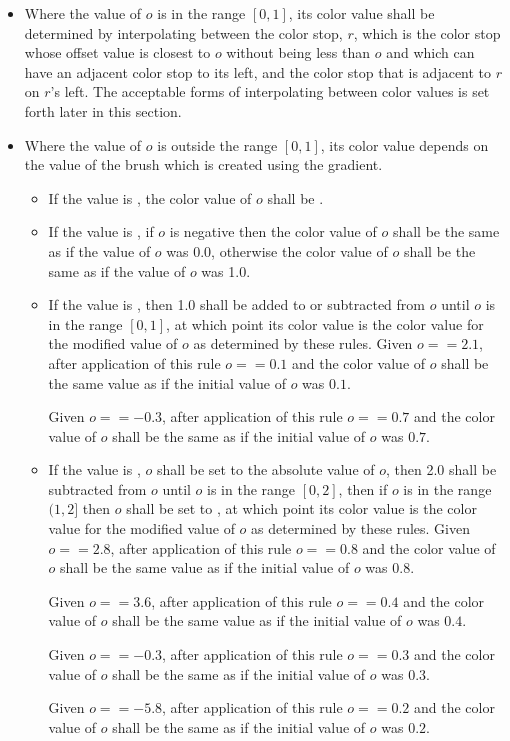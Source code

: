 \begin{itemize}
\item Where the value of $o$ is in the range $[0,1]$, its color value shall be determined by interpolating between the color stop, $r$, which is the color stop whose offset value is closest to $o$ without being less than $o$ and which can have an adjacent color stop to its left, and the color stop that is adjacent to $r$ on $r$'s left. The acceptable forms of interpolating between color values is set forth later in this section.

\item Where the value of $o$ is outside the range $[0,1]$, its color value depends on the  value of the brush which is created using the gradient.
	\begin{itemize}
	\item If the  value is , the color value of $o$ shall be .
	
	\item If the  value is , if $o$ is negative then the color value of $o$ shall be the same as if the value of $o$ was 0.0, otherwise the color value of $o$ shall be the same as if the value of $o$ was 1.0.
	
	\item If the  value is , then 1.0 shall be added to or subtracted from $o$ until $o$ is in the range $[0,1]$, at which point its color value is the color value for the modified value of $o$ as determined by these rules.
	\enterexample
	Given $o == 2.1$, after application of this rule $o == 0.1$ and the color value of $o$ shall be the same value as if the initial value of $o$ was $0.1$.
	
	Given $o == -0.3$, after application of this rule $o == 0.7$ and the color value of $o$ shall be the same as if the initial value of $o$ was $0.7$.
	\exitexample
	
	\item If the  value is , $o$ shall be set to the absolute value of $o$, then 2.0 shall be subtracted from $o$ until $o$ is in the range $[0,2]$, then if $o$ is in the range $(1,2]$ then $o$ shall be set to , at which point its color value is the color value for the modified value of $o$ as determined by these rules.
	\enterexample
	Given $o == 2.8$, after application of this rule $o == 0.8$ and the color value of $o$ shall be the same value as if the initial value of $o$ was $0.8$.
	
	Given $o == 3.6$, after application of this rule $o == 0.4$ and the color value of $o$ shall be the same value as if the initial value of $o$ was $0.4$.
	
	Given $o == -0.3$, after application of this rule $o == 0.3$ and the color value of $o$ shall be the same as if the initial value of $o$ was $0.3$.
	
	Given $o == -5.8$, after application of this rule $o == 0.2$ and the color value of $o$ shall be the same as if the initial value of $o$ was $0.2$.
	\exitexample
	\end{itemize}
\end{itemize}

